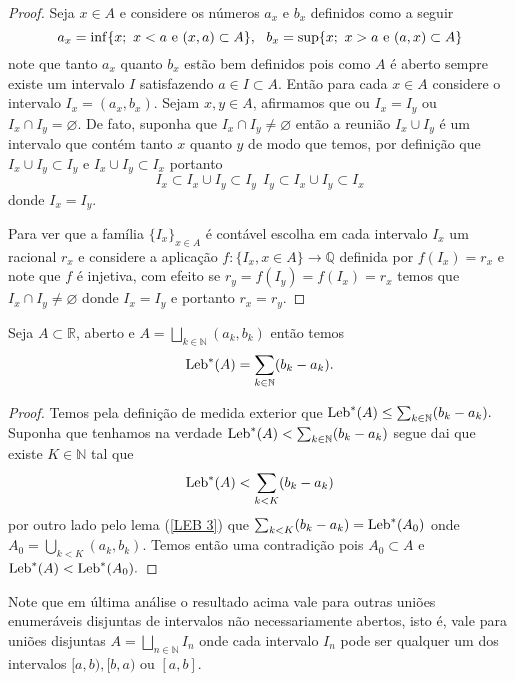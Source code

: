 \begin{proof}
Seja $x\in A$  e considere os números $a_x$ e $b_x$ 
definidos como a seguir
$$
a_x
=
\inf\{x;~x<a~\textnormal{e}~(x,a)\subset A\},~~b_x
=
\sup \{x;~x>a~\textnormal{e}~(a,x)\subset A\}
$$
note que  tanto $a_x$ quanto $b_x$ estão bem definidos 
pois como $A$ é  aberto sempre existe um intervalo $I$ 
satisfazendo $a\in I\subset A$. 
Então para cada $x\in A$ considere o intervalo 
$I_x=(a_x,b_x)$. Sejam $x,y\in A$, afirmamos que ou $I_x=I_y$ 
ou $I_x\cap I_y=\varnothing.$ 
De fato, suponha que $I_x\cap I_y\neq \varnothing$ 
então a reunião $I_x\cup I_y$ é um intervalo que 
contém tanto $x$ quanto $y$ de modo que temos, 
por definição que $  I_ x\cup I_y\subset I_y$ 
e $I_x\cup I_y\subset I_x$ portanto 
$$
I_x\subset I_x\cup I_y\subset I_y~~ I_y\subset I_x\cup I_y\subset I_x
$$
donde $I_x=I_y$.



Para ver que a família $\{I_x\}_{x\in A}$ é 
contável escolha em cada intervalo $I_x$ um 
racional $r_x$ e considere a aplicação  
$f:\{I_x,x\in A\}\to \mathbb{Q}$ definida por 
$f(I_x)=r_x$ e note que $f$ é injetiva, com efeito se 
$r_y=f(I_y)=f(I_x)=r_x$ temos que 
$I_x\cap I_y\neq \varnothing$ donde $I_x=I_y$ e portanto $r_x=r_y$.

\end{proof}




\begin{lema}\label{LEB 4}
Seja $A\subset \mathbb{R}$,  aberto e 
$A=\bigsqcup_{k\in \mathbb{N}}(a_k,b_k)$ então temos 
$$
\textnormal{Leb}^{*}(A)=\sum_{k\in \mathbb{N}}(b_k-a_k).
$$
\end{lema}

\begin{proof}
Temos pela definição de medida exterior que 
$\textnormal{Leb}^{*}(A)\leq \sum_{k\in \mathbb{N}}(b_k-a_k).$ 
Suponha que tenhamos na verdade 
$\textnormal{Leb}^{*}(A)< \sum_{k\in \mathbb{N}}(b_k-a_k)$ 
segue dai que existe $K\in \mathbb{N}$ tal que 
$$
\textnormal{Leb}^{*}(A)< \sum_{k<K}(b_k-a_k)
$$
 por outro lado pelo lema (\ref{LEB 3}) 
 que $\sum_{k<K}(b_k-a_k)=\textnormal{Leb}^{*}(A_0)$ 
 onde $A_0=\bigcup_{k<K}(a_k,b_k)$.
Temos então uma contradição pois 
$A_0\subset A$ e $\textnormal{Leb}^{*}(A)<\textnormal{Leb}^{*}(A_0).$
\end{proof}

Note que em última análise o resultado acima 
vale para outras uniões enumeráveis disjuntas 
de intervalos não necessariamente abertos, 
isto é, vale para uniões disjuntas 
$A=\bigsqcup_{n\in\mathbb{N}} I_n$ onde 
cada intervalo $I_n$ pode ser qualquer um 
dos intervalos $[a,b),[b,a)$ ou $[a,b]$. 



